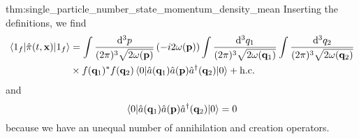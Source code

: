 \begin{delayedproof}{thm:single_particle_number_state_momentum_density_mean}
	Inserting the definitions, we find
	\begin{equation*}
		\begin{split}
			\expval{\hat\pi(t,\vb{x})}{1_f}
			&=
			\int\frac{\dd[3]{p}}{(2\pi)^3\sqrt{2\omega(\vb{p})}}
			\left(
				-i
				2\omega(\vb{p})
			\right)
			\int\frac{\dd[3]{q_1}}{(2\pi)^3\sqrt{2\omega(\vb{q}_1)}}
			\int\frac{\dd[3]{q_2}}{(2\pi)^3\sqrt{2\omega(\vb{q}_2)}}
			\\
			&\times
			f(\vb{q}_1)^*
			f(\vb{q}_2)
			\expval{\hat{a}(\vb{q}_1)\hat{a}(\vb{p})\hat{a}^\dagger(\vb{q}_2)}{0}
			+
			\text{h.c.}			
		\end{split}
	\end{equation*}
	and
	\begin{equation*}
		\expval{\hat{a}(\vb{q}_1)\hat{a}(\vb{p})\hat{a}^\dagger(\vb{q}_2)}{0}
		=
		0
	\end{equation*}
	because we have an unequal number of annihilation and creation operators.
\end{delayedproof}

